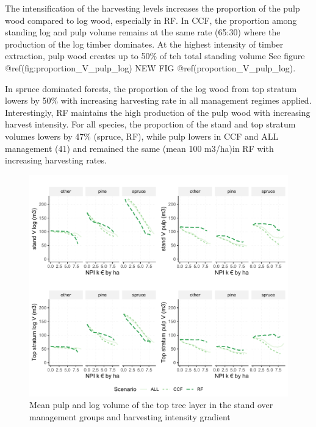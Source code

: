 \documentclass[]{elsarticle} %
\makeatletter
\def\maxwidth{\ifdim\Gin@nat@width>\linewidth\linewidth
\else\Gin@nat@width\fi}
\let\Oldincludegraphics\includegraphics
\renewcommand{\includegraphics}[1]{\Oldincludegraphics[width=\maxwidth]{#1}}
\makeatother
\begin{document}
The intensification of the harvesting levels increases the proportion of
the pulp wood compared to log wood, especially in RF. In CCF, the
proportion among standing log and pulp volume remains at the same rate
(65:30) where the production of the log timber dominates. At the highest
intensity of timber extraction, pulp wood creates up to 50\% of teh
total standing volume See figure @ref(fig:proportion\_V\_pulp\_log) NEW
FIG @ref(proportion\_V\_pulp\_log).

In spruce dominated forests, the proportion of the log wood from top
stratum lowers by 50\% with increasing harvesting rate in all management
regimes applied. Interestingly, RF maintains the high production of the
pulp wood with increasing harvest intensity. For all species, the
proportion of the stand and top stratum volumes lowers by 47\% (spruce,
RF), while pulp lowers in CCF and ALL management (41) and remained the
same (mean 100 m3/ha)in RF with increasing harvesting rates.

\begin{figure}
\centering
\includegraphics{test_manus_files/figure-latex/V-stand-stratum-1.pdf}
\caption{Mean pulp and log volume of the top tree layer in the stand
over management groups and harvesting intensity gradient}
\end{figure}
\end{document}
